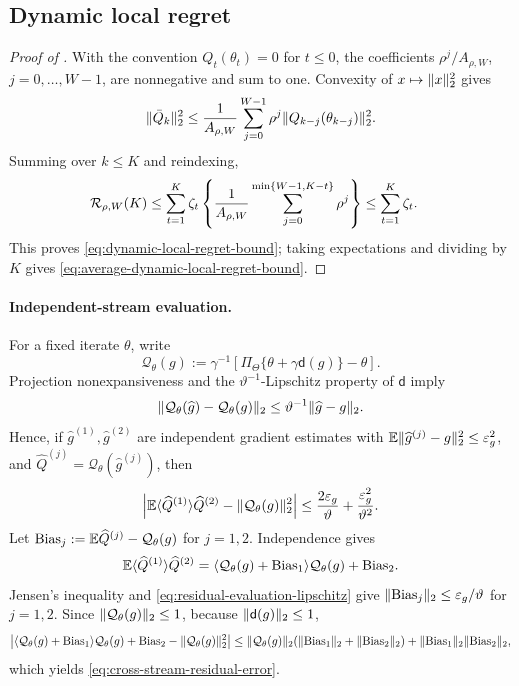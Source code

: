 \subsection{Dynamic local regret}

\begin{proof}[Proof of ]
With the convention $Q_t(\theta_t)=0$ for $t\le0$, the coefficients $\rho^j/A_{\rho,W}$, $j=0,\ldots,W-1$, are nonnegative and sum to one.  Convexity of $x\mapsto\lVert x\rVert_2^2$ gives
\[
 \lVert\bar Q_k\rVert_2^2
 \le \frac{1}{A_{\rho,W}}\sum_{j=0}^{W-1}\rho^j
       \lVert Q_{k-j}(\theta_{k-j})\rVert_2^2.
\]
Summing over $k\le K$ and reindexing,
\begin{align*}
 \mathcal R_{\rho,W}(K)
 &\le
 \sum_{t=1}^{K}\zeta_t
 \left\{\frac{1}{A_{\rho,W}}\sum_{j=0}^{\min\{W-1,K-t\}}\rho^j\right\}
 \le \sum_{t=1}^{K}\zeta_t.
\end{align*}
This proves \eqref{eq:dynamic-local-regret-bound}; taking expectations and dividing by $K$ gives \eqref{eq:average-dynamic-local-regret-bound}.
\end{proof}

\paragraph{Independent-stream evaluation.}

For a fixed iterate $\theta$, write
\[
 \mathcal Q_\theta(g)
 :=\gamma^{-1}\!\left[\Pi_\Theta\{\theta+\gamma\mathsf d(g)\}-\theta\right].
\]
Projection nonexpansiveness and the $\vartheta^{-1}$-Lipschitz property of $\mathsf d$ imply
\begin{equation}\label{eq:residual-evaluation-lipschitz}
 \lVert\mathcal Q_\theta(\widehat g)-\mathcal Q_\theta(g)\rVert_2
 \le \vartheta^{-1}\lVert\widehat g-g\rVert_2.
\end{equation}
Hence, if $\widehat g^{(1)},\widehat g^{(2)}$ are independent gradient estimates with
$\mathbb E\lVert\widehat g^{(j)}-g\rVert_2^2\le\varepsilon_g^2$, and
$\widehat Q^{(j)}=\mathcal Q_\theta(\widehat g^{(j)})$, then
\begin{equation}\label{eq:cross-stream-residual-error}
 \left|
 \mathbb E\langle\widehat Q^{(1)}\rangle{\widehat Q^{(2)}}
 -\lVert\mathcal Q_\theta(g)\rVert_2^2
 \right|
 \le \frac{2\varepsilon_g}{\vartheta}
 +\frac{\varepsilon_g^2}{\vartheta^2}.
\end{equation}
Let $\operatorname{Bias}_j:=\mathbb E\widehat Q^{(j)}-\mathcal Q_\theta(g)$ for $j=1,2$.
Independence gives
\[
 \mathbb E\langle\widehat Q^{(1)}\rangle{\widehat Q^{(2)}}
 =\langle\mathcal Q_\theta(g)+\operatorname{Bias}_1\rangle
 {\mathcal Q_\theta(g)+\operatorname{Bias}_2}.
\]
Jensen's inequality and \eqref{eq:residual-evaluation-lipschitz} give
$\lVert\operatorname{Bias}_j\rVert_2\le\varepsilon_g/\vartheta$ for $j=1,2$.  Since
$\lVert\mathcal Q_\theta(g)\rVert_2\le1$, because $\lVert\mathsf d(g)\rVert_2\le1$,
\[
 \left|
 \langle\mathcal Q_\theta(g)+\operatorname{Bias}_1\rangle
 {\mathcal Q_\theta(g)+\operatorname{Bias}_2}
 -\lVert\mathcal Q_\theta(g)\rVert_2^2
 \right|
 \le \lVert\mathcal Q_\theta(g)\rVert_2
 (\lVert\operatorname{Bias}_1\rVert_2+\lVert\operatorname{Bias}_2\rVert_2)
 +\lVert\operatorname{Bias}_1\rVert_2\lVert\operatorname{Bias}_2\rVert_2,
\]
which yields \eqref{eq:cross-stream-residual-error}.

